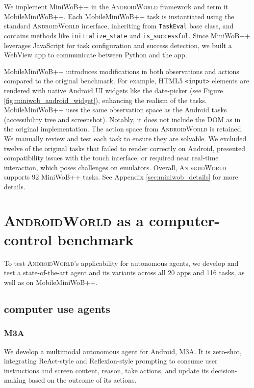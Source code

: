 \documentclass{article}
\newcommand{\system}{\textsc{AndroidWorld}\xspace}
\newcommand{\agent}{\textsc{M3A}\xspace}
\newcommand{\ntasks}{116\xspace}
\newcommand{\napps}{20\xspace}
\newcommand{\miniwob}{MiniWoB++\xspace}
\newcommand{\mobileminiwob}{MobileMiniWoB++\xspace}
\begin{document}
We implement MiniWoB++ in the \system framework and term it \mobileminiwob. Each \mobileminiwob task is instantiated using the standard \system interface, inheriting from \texttt{TaskEval} base class, and contains methods like \texttt{initialize\_state} and \texttt{is\_successful}. Since MiniWoB++ leverages JavaScript for task configuration and success detection, we built a WebView app to communicate between Python and the app.

\mobileminiwob introduces modifications in both observations and actions compared to the original benchmark. For example, HTML5 \lstinline|<input>| elements are rendered with native Android UI widgets like the date-picker (see Figure~ \ref{fig:miniwob_android_widget}), enhancing the realism of the tasks. \mobileminiwob uses the same observation space as the Android tasks (accessibility tree and screenshot). Notably, it does not include the DOM as in the original implementation. The action space from \system is retained. We manually review and test each task to ensure they are solvable. We excluded twelve of the original tasks that failed to render correctly on Android, presented compatibility issues with the touch interface, or required near real-time interaction, which poses challenges on emulators. Overall, \system supports 92 \miniwob tasks. See Appendix \ref{sec:miniwob_details} for more details.

\section{\system as a computer-control benchmark}
\label{sec:experiments}

To test \system's applicability for autonomous agents, we develop and test a state-of-the-art agent and its variants across all \napps apps and \ntasks tasks, as well as on \mobileminiwob.

\subsection{computer use agents}
\subsubsection{\agent}

We develop a multimodal autonomous agent for Android, \agent. It is zero-shot, integrating ReAct-style \citep{Yao2022-nv} and Reflexion-style \citep{shinn2023reflexion} prompting to consume user instructions and screen content, reason, take actions, and update its decision-making based on the outcome of its actions.
\end{document}
